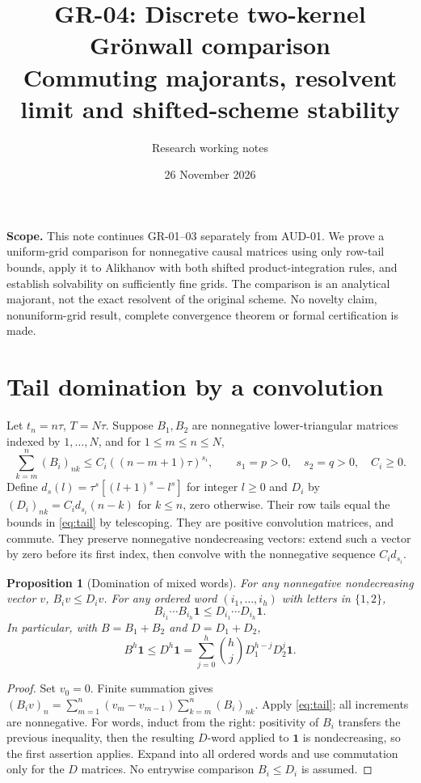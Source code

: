 \documentclass[11pt,a4paper]{article}
\title{GR-04: Discrete two-kernel Gr\"onwall comparison\\\large Commuting majorants, resolvent limit and shifted-scheme stability}
\author{Research working notes}
\date{26 November 2026}
\newtheorem{proposition}{Proposition}
\newcommand{\one}{\mathbf1}
\begin{document}
\maketitle
\noindent\textbf{Scope.} This note continues GR-01--03 separately from AUD-01. We prove a uniform-grid comparison for nonnegative causal matrices using only row-tail bounds, apply it to Alikhanov with both shifted product-integration rules, and establish solvability on sufficiently fine grids. The comparison is an analytical majorant, not the exact resolvent of the original scheme. No novelty claim, nonuniform-grid result, complete convergence theorem or formal certification is made.
\section{Tail domination by a convolution}
Let $t_n=n\tau$, $T=N\tau$. Suppose $B_1,B_2$ are nonnegative lower-triangular matrices indexed by $1,\ldots,N$, and for $1\le m\le n\le N$,
\begin{equation}\label{eq:tail}
 \sum_{k=m}^n(B_i)_{nk}\le C_i((n-m+1)\tau)^{s_i},\qquad s_1=p>0,\quad s_2=q>0,\quad C_i\ge0.
\end{equation}
Define $d_s(l)=\tau^s[(l+1)^s-l^s]$ for integer $l\ge0$ and $D_i$ by $(D_i)_{nk}=C_i d_{s_i}(n-k)$ for $k\le n$, zero otherwise. Their row tails equal the bounds in \eqref{eq:tail} by telescoping. They are positive convolution matrices, and commute. They preserve nonnegative nondecreasing vectors: extend such a vector by zero before its first index, then convolve with the nonnegative sequence $C_i d_{s_i}$.
\begin{proposition}[Domination of mixed words]\label{prop:words}
For any nonnegative nondecreasing vector $v$, $B_iv\le D_iv$. For any ordered word $(i_1,\ldots,i_h)$ with letters in $\{1,2\}$,
\[
 B_{i_1}\cdots B_{i_h}\one\le D_{i_1}\cdots D_{i_h}\one.
\]
In particular, with $B=B_1+B_2$ and $D=D_1+D_2$,
\[B^h\one\le D^h\one=\sum_{j=0}^h\binom hj D_1^{h-j}D_2^j\one.\]
\end{proposition}
\begin{proof}
Set $v_0=0$. Finite summation gives $(B_iv)_n=\sum_{m=1}^n(v_m-v_{m-1})\sum_{k=m}^n(B_i)_{nk}$. Apply \eqref{eq:tail}; all increments are nonnegative. For words, induct from the right: positivity of $B_i$ transfers the previous inequality, then the resulting $D$-word applied to $\one$ is nondecreasing, so the first assertion applies. Expand into all ordered words and use commutation only for the $D$ matrices. No entrywise comparison $B_i\le D_i$ is assumed.
\end{proof}
\end{document}
